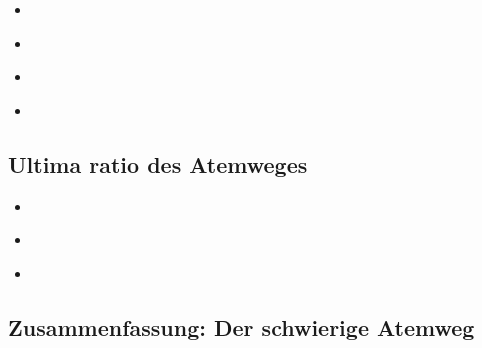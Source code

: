 {%

}
{%
\begin{itemize}
  \item
\end{itemize}
}

{%

}
{%
\begin{itemize}
  \item
\end{itemize}
}

{%

}
{%
\begin{itemize}
  \item
\end{itemize}
}

{%

}
{%
\begin{itemize}
  \item
\end{itemize}
}

\subsection{Ultima ratio des Atemweges}

{%

}
{%
\begin{itemize}
  \item
\end{itemize}
}

{%

}
{%
\begin{itemize}
  \item
\end{itemize}
}

{%

}
{%
\begin{itemize}
  \item
\end{itemize}
}

\subsection{Zusammenfassung: Der schwierige Atemweg}

\ChapterEnd